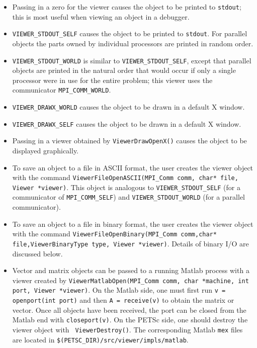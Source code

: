 \begin{itemize}
\item Passing in a zero for the viewer causes the object to be printed 
      to {\tt stdout}; this is most useful when viewing an object in 
      a debugger.
\item {\tt VIEWER\_STDOUT\_SELF} 
      causes the object to be printed to {\tt stdout}.
      For parallel objects the parts owned by individual processors are 
      printed in random order.
\item {\tt VIEWER\_STDOUT\_WORLD} 
      is similar to {\tt VIEWER\_STDOUT\_SELF}, except that 
      parallel objects are printed in the natural order that would occur
      if only a single processor were in use for the entire problem;
      this viewer uses the communicator {\tt MPI\_COMM\_WORLD}.
\item {\tt VIEWER\_DRAWX\_WORLD}  causes the 
      object to be drawn in a default X window.
\item {\tt VIEWER\_DRAWX\_SELF}  causes the 
      object to be drawn in a default X window.
\item Passing in a viewer obtained by
      {\tt ViewerDrawOpenX()} causes the object to be displayed graphically.
\item To save an object to a file in ASCII format, the user creates
      the viewer object with the command
      {\tt ViewerFileOpenASCII(MPI\_Comm comm, char* file, Viewer *viewer)}.  
      This object is 
      analogous to {\tt VIEWER\_STDOUT\_SELF} (for a communicator of
      {\tt MPI\_COMM\_SELF}) and 
      {\tt VIEWER\_STDOUT\_WORLD} (for a parallel communicator).
\item To save an object to a file in binary format, the user creates
      the viewer object with the command
      {\tt ViewerFileOpenBinary(MPI\_Comm comm,char* file,ViewerBinaryType type,
      Viewer *viewer)}.   Details of binary
      I/O are discussed below.
\item Vector and matrix objects can be passed to a running Matlab process
      with a viewer created by {\tt ViewerMatlabOpen(MPI\_Comm comm,
      char *machine, int port, Viewer *viewer)}.  
      On the Matlab side, one must first run {\tt v = openport(int port)}
      and then {\tt A = receive(v)} to obtain the matrix or vector. Once all
      objects have been received, the port can be closed from the Matlab end
      with {\tt closeport(v)}. On the PETSc side, one should destroy
      the viewer object with  {\tt
      ViewerDestroy()}. The corresponding Matlab {\tt mex}
      files are located in {\tt \$(PETSC\_DIR)/src/viewer/impls/matlab}.
\end{itemize}

